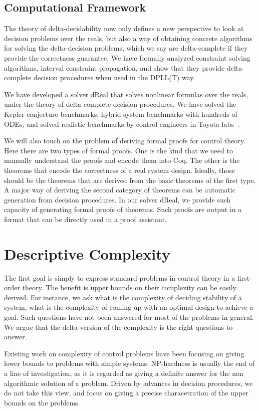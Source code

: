 \documentclass[10pt]{article}
\theoremstyle{definition}
\begin{document}
\subsection{Computational Framework}

The theory of delta-decidability now only defines a new perspective to look at decision problems over the reals, but also a way of obtaining concrete algorithms for solving the delta-decision problems, which we say are delta-complete if they provide the correctness guarantee. We have formally analyzed constraint solving algorithms, interval constraint propagation, and show that they provide delta-complete decision procedures when used in the DPLL(T) way. 

We have developed a solver dReal that solves nonlinear formulas over the reals, under the theory of delta-complete decision procedures. We have solved the Kepler conjecture benchmarks, hybrid system benchmarks with hundreds of ODEs, and solved realistic benchmarks by control engineers in Toyota labs~\cite{}. 

We will also touch on the problem of deriving formal proofs for control theory. Here there are two types of formal proofs. One is the kind that we need to manually understand the proofs and encode them into Coq. The other is the theorems that encode the correctness of a real system design. Ideally, those should be the theorems that are derived from the basic theorems of the first type. A major way of deriving the second category of theorems can be automatic generation from decision procedures. In our solver dReal, we provide such capacity of generating formal proofs of theorems. Such proofs are output in a format that can be directly used in a proof assistant. 


\section{Descriptive Complexity}

The first goal is simply to express standard problems in control theory in a first-order theory. The benefit is upper bounds on their complexity can be easily derived. For instance, we ask what is the complexity of deciding stability of a system, what is the complexity of coming up with an optimal design to achieve a goal. Such questions have not been answered for most of the problems in general. We argue that the delta-version of the complexity is the right questions to answer. 

Existing work on complexity of control problems have been focusing on giving lower bounds to problems with simple systems. NP-hardness is usually the end of a line of investigation, as it is regarded as giving a definite answer for the non algorithmic solution of a problem. Driven by advances in decision procedures, we do not take this view, and focus on giving a precise characetration of the upper bounds on the problems. 
\end{document}
